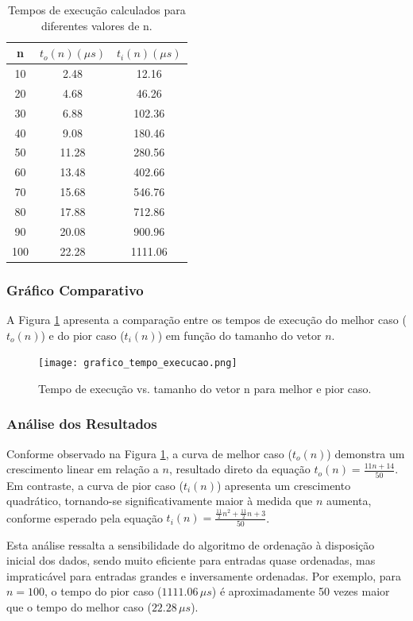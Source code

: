 \documentclass[12pt,a4paper]{article}
\begin{document}
\begin{table}[H]
\centering
\begin{tabular}{|c|c|c|}
\hline
\textbf{n} & \textbf{$t_o(n) (\mu s)$} & \textbf{$t_i(n) (\mu s)$} \\
\hline
10 & 2.48 & 12.16 \\
20 & 4.68 & 46.26 \\
30 & 6.88 & 102.36 \\
40 & 9.08 & 180.46 \\
50 & 11.28 & 280.56 \\
60 & 13.48 & 402.66 \\
70 & 15.68 & 546.76 \\
80 & 17.88 & 712.86 \\
90 & 20.08 & 900.96 \\
100 & 22.28 & 1111.06 \\
\hline
\end{tabular}
\caption{Tempos de execução calculados para diferentes valores de n.}
\end{table}

\subsubsection*{Gráfico Comparativo}

A Figura \ref{fig:tempo_execucao} apresenta a comparação entre os tempos de execução do melhor caso ($t_o(n)$) e do pior caso ($t_i(n)$) em função do tamanho do vetor $n$.

\begin{figure}[H]
\centering
\texttt{[image: grafico\_tempo\_execucao.png]}
\caption{Tempo de execução vs. tamanho do vetor n para melhor e pior caso.}
\label{fig:tempo_execucao}
\end{figure}

\subsubsection*{Análise dos Resultados}

Conforme observado na Figura \ref{fig:tempo_execucao}, a curva de melhor caso ($t_o(n)$) demonstra um crescimento linear em relação a $n$, resultado direto da equação $t_o(n) = \frac{11n + 14}{50}$. Em contraste, a curva de pior caso ($t_i(n)$) apresenta um crescimento quadrático, tornando-se significativamente maior à medida que $n$ aumenta, conforme esperado pela equação $t_i(n) = \frac{\frac{11}{2}n^{2} + \frac{11}{2}n + 3}{50}$. 

Esta análise ressalta a sensibilidade do algoritmo de ordenação à disposição inicial dos dados, sendo muito eficiente para entradas quase ordenadas, mas impraticável para entradas grandes e inversamente ordenadas. Por exemplo, para $n=100$, o tempo do pior caso ($1111.06\,\mu s$) é aproximadamente 50 vezes maior que o tempo do melhor caso ($22.28\,\mu s$).
\end{document}
